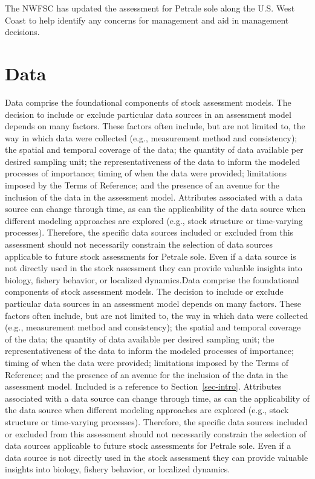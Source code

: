 \documentclass[
]{scrartcl}
\begin{document}
The NWFSC has updated the assessment for Petrale sole along the U.S.
West Coast to help identify any concerns for management and aid in
management decisions.

\section{Data}\label{sec-data}

Data comprise the foundational components of stock assessment models.
The decision to include or exclude particular data sources in an
assessment model depends on many factors. These factors often include,
but are not limited to, the way in which data were collected (e.g.,
measurement method and consistency); the spatial and temporal coverage
of the data; the quantity of data available per desired sampling unit;
the representativeness of the data to inform the modeled processes of
importance; timing of when the data were provided; limitations imposed
by the Terms of Reference; and the presence of an avenue for the
inclusion of the data in the assessment model. Attributes associated
with a data source can change through time, as can the applicability of
the data source when different modeling approaches are explored (e.g.,
stock structure or time-varying processes). Therefore, the specific data
sources included or excluded from this assessment should not necessarily
constrain the selection of data sources applicable to future stock
assessments for Petrale sole. Even if a data source is not directly used
in the stock assessment they can provide valuable insights into biology,
fishery behavior, or localized dynamics.Data comprise the foundational
components of stock assessment models. The decision to include or
exclude particular data sources in an assessment model depends on many
factors. These factors often include, but are not limited to, the way in
which data were collected (e.g., measurement method and consistency);
the spatial and temporal coverage of the data; the quantity of data
available per desired sampling unit; the representativeness of the data
to inform the modeled processes of importance; timing of when the data
were provided; limitations imposed by the Terms of Reference; and the
presence of an avenue for the inclusion of the data in the assessment
model. Included is a reference to Section~\ref{sec-intro}. Attributes
associated with a data source can change through time, as can the
applicability of the data source when different modeling approaches are
explored (e.g., stock structure or time-varying processes). Therefore,
the specific data sources included or excluded from this assessment
should not necessarily constrain the selection of data sources
applicable to future stock assessments for Petrale sole. Even if a data
source is not directly used in the stock assessment they can provide
valuable insights into biology, fishery behavior, or localized dynamics.
\end{document}
